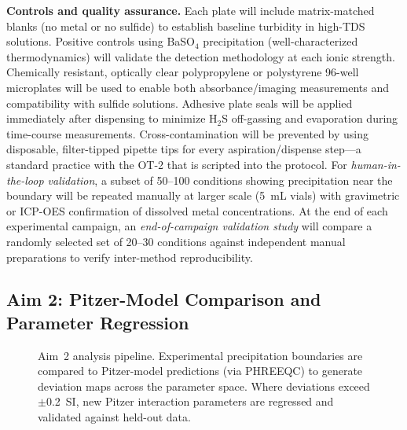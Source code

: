 \documentclass[12pt]{article}
\begin{document}
\textbf{Controls and quality assurance.} Each plate will include matrix-matched blanks (no metal or no sulfide) to establish baseline turbidity in high-TDS solutions. Positive controls using BaSO$_4$ precipitation (well-characterized thermodynamics) will validate the detection methodology at each ionic strength. Chemically resistant, optically clear polypropylene or polystyrene 96-well microplates will be used to enable both absorbance/imaging measurements and compatibility with sulfide solutions. Adhesive plate seals will be applied immediately after dispensing to minimize H$_2$S off-gassing and evaporation during time-course measurements. Cross-contamination will be prevented by using disposable, filter-tipped pipette tips for every aspiration/dispense step---a standard practice with the OT-2 that is scripted into the protocol. For \textit{human-in-the-loop validation}, a subset of 50--100 conditions showing precipitation near the boundary will be repeated manually at larger scale (5~mL vials) with gravimetric or ICP-OES confirmation of dissolved metal concentrations. At the end of each experimental campaign, an \textit{end-of-campaign validation study} will compare a randomly selected set of 20--30 conditions against independent manual preparations to verify inter-method reproducibility.

\subsection{Aim 2: Pitzer-Model Comparison and Parameter Regression}

\begin{figure}
\centering
\vspace{-1.5em}
\fbox{\rule{0pt}{1.5in}\rule{0.35\textwidth}{0pt}}
\caption{Aim~2 analysis pipeline. Experimental precipitation boundaries are compared to Pitzer-model predictions (via PHREEQC) to generate deviation maps across the parameter space. Where deviations exceed $\pm$0.2~SI, new Pitzer interaction parameters are regressed and validated against held-out data.}
\label{fig:aim2}
\vspace{-1em}
\end{figure}
\end{document}

